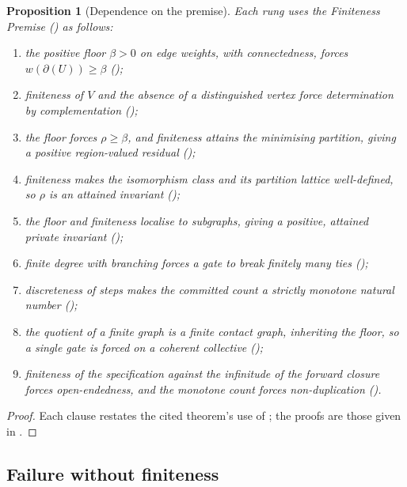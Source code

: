 \documentclass[11pt,a4paper]{article}
\theoremstyle{thmstyle}
\newtheorem{proposition}[theorem]{Proposition}
\theoremstyle{definition}
\theoremstyle{remark}
\newcommand{\V}{V}                        %
\newcommand{\wt}{w}                       %
\newcommand{\floorc}{\beta}               %
\newcommand{\cut}{\partial}               %
\newcommand{\Res}{\rho}                   %
\begin{document}
\begin{proposition}[Dependence on the premise]
\label{prop:dependence}
Each rung uses the Finiteness Premise \textup{(}\textup{)} as
follows:
\begin{enumerate}[label=\textup{(T\arabic*)},leftmargin=3em,start=0]
\item the positive floor $\floorc>0$ on edge weights, with connectedness, forces
$\wt(\cut(U))\ge\floorc$ \textup{(}\textup{)};
\item finiteness of $\V$ and the absence of a distinguished vertex force
determination by complementation \textup{(}\textup{)};
\item the floor forces $\Res\ge\floorc$, and finiteness attains the minimising
partition, giving a positive region-valued residual
\textup{(}\textup{)};
\item finiteness makes the isomorphism class and its partition lattice
well-defined, so $\Res$ is an attained invariant
\textup{(}\textup{)};
\item the floor and finiteness localise to subgraphs, giving a positive,
attained private invariant \textup{(}\textup{)};
\item finite degree with branching forces a gate to break finitely many ties
\textup{(}\textup{)};
\item discreteness of steps makes the committed count a strictly monotone natural
number \textup{(}\textup{)};
\item the quotient of a finite graph is a finite contact graph, inheriting the
floor, so a single gate is forced on a coherent collective
\textup{(}\textup{)};
\item finiteness of the specification against the infinitude of the forward
closure forces open-endedness, and the monotone count forces non-duplication
\textup{(}\textup{)}.
\end{enumerate}
\end{proposition}

\begin{proof}
Each clause restates the cited theorem's use of ; the proofs are
those given in .
\end{proof}

\subsection{Failure without finiteness}
\end{document}
